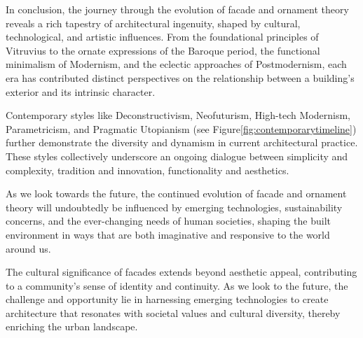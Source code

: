 In conclusion, the journey through the evolution of facade and ornament theory reveals a rich tapestry of architectural ingenuity, shaped by cultural, technological, and artistic influences.
From the foundational principles of Vitruvius to the ornate expressions of the Baroque period, the functional minimalism of Modernism, and the eclectic approaches of Postmodernism, each era has contributed distinct perspectives on the relationship between a building's exterior and its intrinsic character.

Contemporary styles like Deconstructivism, Neofuturism, High-tech Modernism, Parametricism, and Pragmatic Utopianism (see Figure\ref{fig:contemporarytimeline}) further demonstrate the diversity and dynamism in current architectural practice.
These styles collectively underscore an ongoing dialogue between simplicity and complexity, tradition and innovation, functionality and aesthetics.

As we look towards the future, the continued evolution of facade and ornament theory will undoubtedly be influenced by emerging technologies, sustainability concerns, and the ever-changing needs of human societies, shaping the built environment in ways that are both imaginative and responsive to the world around us.

The cultural significance of facades extends beyond aesthetic appeal, contributing to a community's sense of identity and continuity.
As we look to the future, the challenge and opportunity lie in harnessing emerging technologies to create architecture that resonates with societal values and cultural diversity, thereby enriching the urban landscape.




